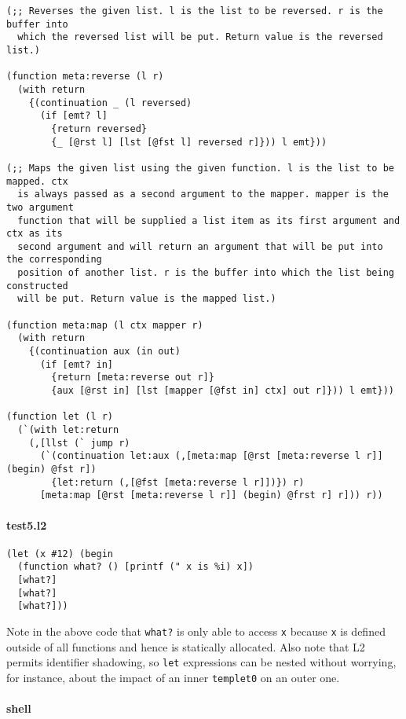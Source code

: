 \documentclass[]{article}
\let\oldparagraph\paragraph
\renewcommand{\paragraph}[1]{\oldparagraph{#1}\mbox{}}
\begin{document}
\begin{verbatim}
(;; Reverses the given list. l is the list to be reversed. r is the buffer into
  which the reversed list will be put. Return value is the reversed list.)

(function meta:reverse (l r)
  (with return
    {(continuation _ (l reversed)
      (if [emt? l]
        {return reversed}
        {_ [@rst l] [lst [@fst l] reversed r]})) l emt}))

(;; Maps the given list using the given function. l is the list to be mapped. ctx
  is always passed as a second argument to the mapper. mapper is the two argument
  function that will be supplied a list item as its first argument and ctx as its
  second argument and will return an argument that will be put into the corresponding
  position of another list. r is the buffer into which the list being constructed
  will be put. Return value is the mapped list.)

(function meta:map (l ctx mapper r)
  (with return
    {(continuation aux (in out)
      (if [emt? in]
        {return [meta:reverse out r]}
        {aux [@rst in] [lst [mapper [@fst in] ctx] out r]})) l emt}))

(function let (l r)
  (`(with let:return
    (,[llst (` jump r)
      (`(continuation let:aux (,[meta:map [@rst [meta:reverse l r]] (begin) @fst r])
        {let:return (,[@fst [meta:reverse l r]])}) r)
      [meta:map [@rst [meta:reverse l r]] (begin) @frst r] r])) r))
\end{verbatim}

\paragraph{test5.l2}\label{test5.l2}

\begin{verbatim}
(let (x #12) (begin
  (function what? () [printf (" x is %i) x])
  [what?]
  [what?]
  [what?]))
\end{verbatim}

Note in the above code that \texttt{what?} is only able to access
\texttt{x} because \texttt{x} is defined outside of all functions and
hence is statically allocated. Also note that L2 permits identifier
shadowing, so \texttt{let} expressions can be nested without worrying,
for instance, about the impact of an inner \texttt{templet0} on an outer
one.

\paragraph{shell}\label{shell-4}
\end{document}
